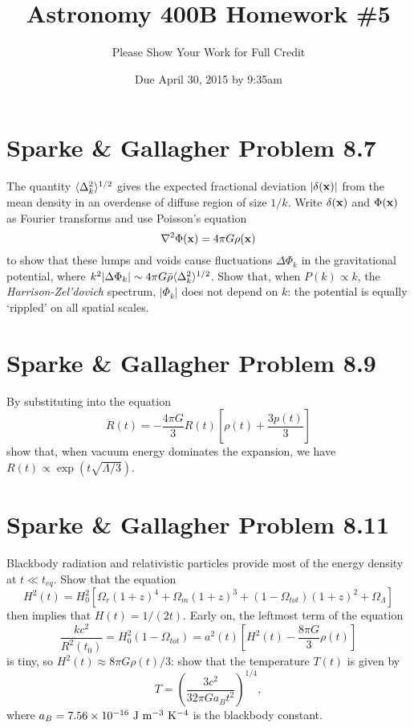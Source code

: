 \documentclass[]{article}
\title{Astronomy 400B Homework \#5}
\author{Please Show Your Work for Full Credit}
\date{Due April 30, 2015 by 9:35am}
\begin{document}
\maketitle

\section{Sparke \& Gallagher Problem 8.7}

The quantity $\langle\Delta_k^2\rangle^{1/2}$ gives the expected fractional deviation
$|\delta(\mathbf{x})|$ from the mean density in an overdense of diffuse region of
size $1/k$.  Write $\delta(\mathbf{x})$ and $\Phi(\mathbf{x})$ as Fourier transforms and
use Poisson's equation
\begin{equation}
\nabla^2 \Phi(\mathbf{x}) = 4\pi G \rho(\mathbf{x})
\end{equation}
\noindent
to show that these lumps and voids cause fluctuations $\Delta\Phi_k$ in the
gravitational potential, where $k^2|\Delta\Phi_k|\sim4\pi G\bar{\rho}\langle\Delta_k^2\rangle^{1/2}$.
Show that, when $P(k)\propto k$, the {\it Harrison-Zel'dovich} spectrum, $|\Phi_k|$ does
not depend on $k$: the potential is equally `rippled' on all spatial scales.

\section{Sparke \& Gallagher Problem 8.9}

By substituting into the equation
\begin{equation}
\ddot{R}(t) = -\frac{4\pi G}{3} R(t)\left[ \rho(t) + \frac{3p(t)}{3}\right]
\end{equation}
\noindent
show that, when vacuum energy dominates the expansion, we have $R(t) \propto \exp(t\sqrt{\Lambda/3})$.

\section{Sparke \& Gallagher Problem 8.11}

Blackbody radiation and relativistic particles provide most of the
energy density at $t\ll t_{eq}$. Show that the equation
\begin{equation}
H^2(t) = H_0^2[\Omega_r(1+z)^4 + \Omega_m(1+z)^3 + (1 -\Omega_{tot})(1+z)^2 + \Omega_{\Lambda}]
\end{equation}
\noindent
then implies that $H(t)=1/(2t)$. Early on, the leftmost term of the
equation
\begin{equation}
\frac{kc^2}{R^2(t_0)} = H_0^2(1-\Omega_{tot}) = a^2(t)\left[H^2(t) - \frac{8\pi G}{3} \rho(t)\right]
\end{equation}
\noindent
is tiny, so $H^2(t)\approx8\pi G\rho(t)/3$: show that the temperature $T(t)$ is
given by
\begin{equation}
T = \left(\frac{3c^2}{32 \pi G a_B t^2}\right)^{1/4},
\end{equation}
where $a_B = 7.56\times 10^{-16}~\mathrm{J}~\mathrm{m}^{-3}~\mathrm{K}^{-4}$ is the blackbody constant.
\end{document}
